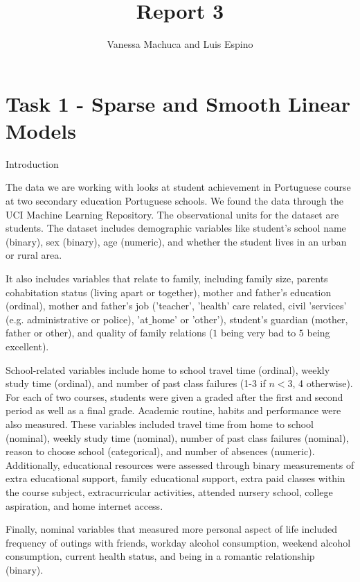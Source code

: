 \documentclass{article}
\title{Report 3}
\author{Vanessa Machuca and Luis Espino}
\begin{document}

\maketitle





\section{Task 1 - Sparse and Smooth Linear Models}

Introduction 

The data we are working with looks at student achievement in Portuguese course at two secondary education Portuguese schools. We found the data through the UCI Machine Learning Repository. The observational units for the dataset are students. The dataset includes demographic variables like student’s school name (binary), sex (binary), age (numeric), and whether the student lives in an urban or rural area. 

It also includes variables that relate to family, including family size, parents cohabitation status (living apart or together), mother and father's education (ordinal), mother and father’s job ('teacher', 'health' care related, civil 'services' (e.g. administrative or police), 'at$\_$home' or 'other'), student’s guardian (mother, father or other), and quality of family relations ($1$ being very bad to $5$ being excellent). 

School-related variables include home to school travel time (ordinal), weekly study time (ordinal), and number of past class failures (1-3 if $n<3$, 4 otherwise). For each of two courses, students were given a graded after the first and second period as well as a final grade.  
Academic routine, habits and performance were also measured. These variables included travel time from home to school (nominal), weekly study time (nominal), number of past class failures (nominal), reason to choose school (categorical), and number of absences (numeric). Additionally, educational resources were assessed through binary measurements of extra educational support, family educational support, extra paid classes within the course subject, extracurricular activities, attended nursery school, college aspiration, and home internet access.

Finally, nominal variables that measured more personal aspect of life included frequency of outings with friends, workday alcohol consumption, weekend alcohol consumption, current health status, and being in a romantic relationship (binary). 
\end{document}
